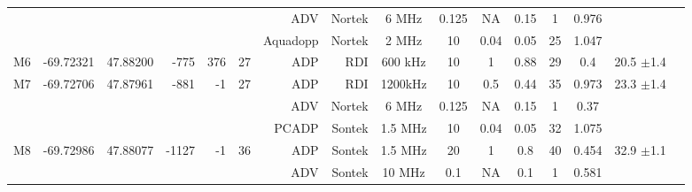 \begin{sidewaystable}
\begin{tabular}{|r|c|c|r|r|r|r|r|c|c|c|c|c|c|c|c|}
    ~                   &                            &                           &                        &                      &                     & ADV          & Nortek     & 6 MHz     & 0.125     & NA       & 0.15       & 1          & 0.976      &                                    \\ %
    ~                   &                            &                           &                        &                      &                     & Aquadopp     & Nortek     & 2 MHz     & 10        & 0.04     & 0.05       & 25         & 1.047      &                                    \\\hline
    M6                  & -69.72321                  & 47.88200                  & -775                   & 376                  & 27                  & ADP          & RDI        & 600 kHz   & 10        & 1        & 0.88       & 29         & 0.4        &  20.5 $\pm$1.4                     \\\hline
    \multirow{3}{*}{M7} & \multirow{3}{*}{-69.72706} & \multirow{3}{*}{47.87961} & \multirow{3}{*}{-881}  & \multirow{3}{*}{-1}  & \multirow{3}{*}{27} & ADP          & RDI        & 1200kHz   & 10        & 0.5      & 0.44       & 35         & 0.973      &  \multirow{3}{*}{23.3 $\pm$1.4}    \\ 
    ~                   &                            &                           &                        &                      &                     & ADV          & Nortek     & 6 MHz     & 0.125     & NA       & 0.15       & 1          & 0.37       &                                    \\ %
    ~                   &                            &                           &                        &                      &                     & PCADP        & Sontek     & 1.5 MHz   & 10        & 0.04     & 0.05       & 32         & 1.075      &                                    \\\hline
    \multirow{4}{*}{M8} & \multirow{4}{*}{-69.72986} & \multirow{4}{*}{47.88077} & \multirow{4}{*}{-1127} & \multirow{4}{*}{-1}  & \multirow{4}{*}{36} & ADP          & Sontek     & 1.5 MHz   & 20        & 1        & 0.8        & 40         & 0.454      &  \multirow{4}{*}{32.9 $\pm$1.1}    \\ 
    ~                   &                            &                           &                        &                      &                     & ADV          & Sontek     & 10 MHz    & 0.1       & NA       & 0.1        & 1          & 0.581      &                                    \\ 

\end{tabular}
\end{sidewaystable}
